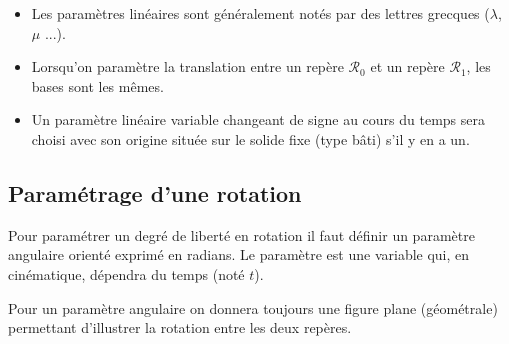 \documentclass[10pt,oneside]{article}
\begin{document}
\begin{rem}
\begin{itemize}
\item Les paramètres linéaires sont généralement notés par des lettres grecques ($\lambda$, $\mu$ ...).
\item Lorsqu'on paramètre la translation entre un repère $\mathcal{R}_0$ et un repère $\mathcal{R}_1$, les bases sont les mêmes. 
\item Un paramètre linéaire variable changeant de signe au cours du temps sera choisi avec son origine située sur le solide fixe (type bâti) s'il y en a un.
\end{itemize}
\end{rem}



\subsection{Paramétrage d'une rotation}

\begin{methode}
Pour paramétrer un degré de liberté en rotation il faut définir un paramètre angulaire orienté exprimé en radians. Le paramètre est une variable qui, en cinématique, dépendra du temps (noté $t$).

Pour un paramètre angulaire on donnera toujours une figure plane (géométrale) permettant d'illustrer la rotation entre les deux repères.
\end{methode}
\end{document}
